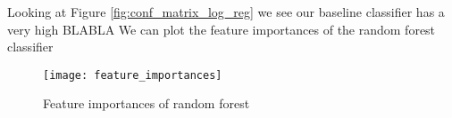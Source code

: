 Looking at Figure \ref{fig:conf_matrix_log_reg} we see our baseline classifier has a very high BLABLA
We can plot the feature importances of the random forest classifier
\begin{figure}[H]
    \hspace*{-1.0cm}
    \centering
    \texttt{[image: feature\_importances]}
    \caption{Feature importances of random forest}
    \label{fig:feature_importances}
\end{figure}